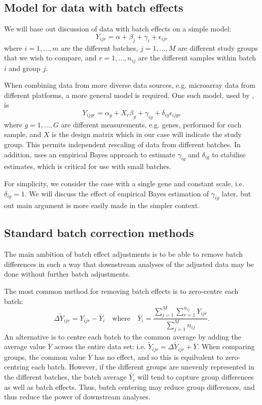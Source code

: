 \documentclass{bio}
\begin{document}
\subsection{Model for data with batch effects}

We will base out discussion of data with batch effects on a simple model:
\begin{equation}
Y_{ijr}=\alpha+\beta_j+\gamma_i+\epsilon_{ijr}
\end{equation}
where $i=1,\ldots,m$ are the different batches, $j=1,\ldots,M$ are different study groups that we wish to compare, and $r=1,\ldots,n_{ij}$ are the different samples within batch $i$ and group $j$.

When combining data from more diverse data sources, e.g. microarray data from different platforms, a more general model is required. One such model, used by \citet{Johnson2007}, is
\begin{equation}
Y_{ijgr}=\alpha_g+X_r\beta_{g}+\gamma_{ig}+\delta_{ig}\epsilon_{ijgr}
\end{equation}
where $g=1,\ldots,G$ are different measurements, e.g. genes, performed for each sample, and $X$ is the design matrix which in our case will indicate the study group. This permits independent rescaling of data from different batches. In addition, \citet{Johnson2007} uses an empirical Bayes approach to estimate $\gamma_{ig}$ and $\delta_{ig}$ to stabilise estimates, which is critical for use with small batches.

For simplicity, we consider the case with a single gene and constant scale, i.e. $\delta_{ig}=1$. We will discuss the effect of empirical Bayes estimation of $\gamma_{ig}$ later, but out main argument is more easily made in the simpler context.

\subsection{Standard batch correction methods}

The main ambition of batch effect adjustments is to be able to remove batch differences in such a way that downstream analyses of the adjusted data may be done without further batch adjustments.

The most common method for removing batch effects is to zero-centre each batch:
\begin{equation}
\Delta\widetilde Y_{ijr}=Y_{ijr}-\overline{Y}_{i}
\quad\text{where}\quad
\overline{Y}_i=\frac{\sum_{j=1}^M\sum_{r=1}^{n_{ij}} Y_{ijr}}{\sum_{j=1}^M n_{ij}}.
\end{equation}
An alternative is to centre each batch to the common average by adding the average value $\overline{Y}$ across the entire data set: i.e. $\widetilde Y_{ijr}=\Delta\widetilde Y_{ijr}+\overline{Y}$. When comparing groups, the common value $\overline{Y}$ has no effect, and so this is equilvalent to zero-centring each batch. However, if the different groups are unevenly represented in the different batches, the batch average $\overline{Y}_i$ will tend to capture group differences as well as batch effects. Thus, batch centering may reduce group differences, and thus reduce the power of downstream analyses.
\end{document}

